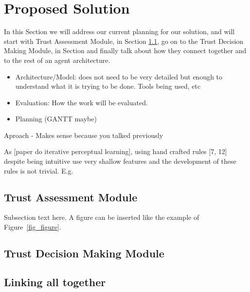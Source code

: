 \section{Proposed Solution}
\label{sec:Solution}
In this Section we will address our current planning for our solution, and will start with Trust Assessment Module, in Section \ref{subsec:Solution:Trust Assessment Module}, go on to the Trust Decision Making Module, in Section and finally talk about how they connect together and to the rest of an agent architecture.



\begin{itemize}
	\item Architecture/Model: does not need to be very detailed but enough to understand what it is trying to be done. Tools being used, etc
	\item Evaluation: How the work will be evaluated.	
	\item Planning (GANTT maybe)	
\end{itemize}Aproach - Makes sense because you talked previously


As [paper do iterative perceptual learning], using hand crafted rules [7, 12] despite being intuitive use very shallow features and the development of these rules is not trivial.
E.g.

\subsection{Trust Assessment Module}
\label{subsec:Solution:Trust Assessment Module}
Subsection text here.
A figure can be inserted like the example of Figure~\ref{fig_figure}.


\subsection{Trust Decision Making Module}
\label{subsec:Solution:Trust Decision Making Module}

\subsection{Linking all together}
\label{subsec:Solution:Linking all together}